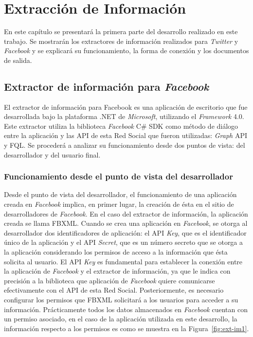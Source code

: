 
\chapter{Extracción de Información}
\label{cap:extraccion}
En este capítulo se presentará la primera parte del desarrollo realizado en este trabajo. Se mostrarán los extractores de información realizados para \textit{Twitter} y \textit{Facebook} y se explicará su funcionamiento, la forma de conexión y los documentos de salida.

\section{Extractor de información para \textit{Facebook}}
El extractor de información para Facebook es una aplicación de escritorio que fue desarrollada bajo la plataforma .NET de \textit{Microsoft}, utilizando el \textit{Framework} 4.0. Este extractor utiliza la biblioteca \textit{Facebook} C\# SDK como método de diálogo entre la aplicación y las API de esta Red Social que fueron utilizadas: \textit{Graph} API y FQL. Se procederá a analizar su funcionamiento desde dos puntos de vista: del desarrollador y del usuario final.

\subsection{Funcionamiento desde el punto de vista del desarrollador}
Desde el punto de vista del desarrollador, el funcionamiento de una aplicación creada en \textit{Facebook} implica, en primer lugar, la creación de ésta en el sitio de desarrolladores de \textit{Facebook}. En el caso del extractor de información, la aplicación creada se llama FBXML.
Cuando se crea una aplicación en \textit{Facebook}, se otorga al desarrollador dos identificadores de aplicación: el API \textit{Key}, que es el identificador único de la aplicación y el API \textit{Secret}, que es un número secreto que se otorga a la aplicación considerando los permisos de acceso a la información que ésta solicita al usuario. El API \textit{Key} es fundamental para establecer la conexión entre la aplicación de \textit{Facebook} y el extractor de información, ya que le indica con precisión a la biblioteca que aplicación de \textit{Facebook} quiere comunicarse efectivamente con el API de esta Red Social.
Posteriormente, es necesario configurar los permisos que FBXML solicitará a los usuarios para acceder a su información. Prácticamente todos los datos almacenados en \textit{Facebook} cuentan con un permiso asociado, en el caso de la aplicación utilizada en este desarrollo, la información respecto a los permisos es como se muestra en la Figura~\ref{fig:ext-im1}.

